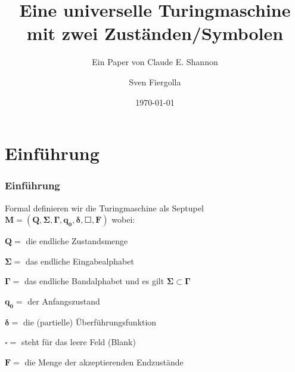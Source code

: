 \documentclass[10pt, xcolor=x11names]{beamer}
\author{Sven Fiergolla}
\title[Kleines Studienprojekt]{Eine universelle Turingmaschine mit zwei Zuständen/Symbolen}
\subtitle[short version]{Ein Paper von Claude E. Shannon}
\date{\today}
\begin{document}
	\frame{\maketitle}

	\section{Einführung}
	\begin{frame}
		
	\frametitle{Einführung}
Formal definieren wir die Turingmaschine als Septupel $\mathbf{ M = (Q,\Sigma,\Gamma,q_0,\delta,\Square,F)} $
 wobei:

\begin{description}


 \item $\mathbf{ Q = }$ die endliche Zustandsmenge
 \item $\mathbf{ \Sigma = }$ das endliche Eingabealphabet
 \item $\mathbf{ \Gamma = }$ das endliche Bandalphabet und es gilt $\mathbf{\Sigma\subset\Gamma}$
 \item $\mathbf{ q_0 = }$ der Anfangszustand
 \item $\mathbf{ \delta = }$ die (partielle) Überführungsfunktion
 \item $\mathbf{ \square = }$ steht für das leere Feld (Blank)
 \item $\mathbf{F = }$ die Menge der akzeptierenden Endzustände

\end{description}	
	
	
	\end{frame}
	
\end{document}
